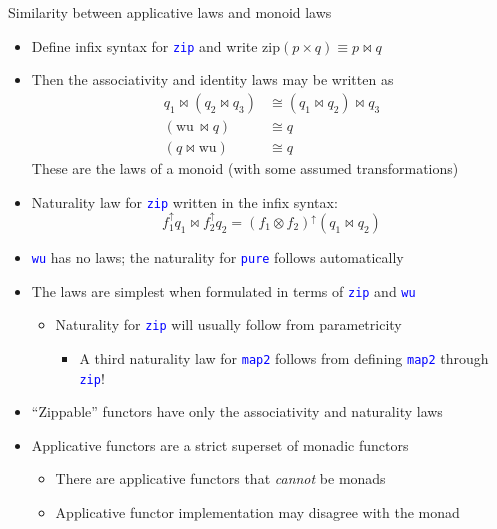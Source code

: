 \documentclass[english]{beamer}
\begin{document}
\begin{frame}{Similarity between applicative laws and monoid laws}
\begin{itemize}
\item Define infix syntax for \texttt{\textcolor{blue}{\footnotesize{}zip}}
and write $\text{zip}\left(p\times q\right)\equiv p\bowtie q$
\item Then the associativity and identity laws may be written as{\footnotesize{}
\begin{align*}
q_{1}\bowtie\left(q_{2}\bowtie q_{3}\right) & \cong\left(q_{1}\bowtie q_{2}\right)\bowtie q_{3}\\
\left(\text{wu}\,\bowtie q\right) & \cong q\\
\left(q\bowtie\text{wu}\right) & \cong q
\end{align*}
}These are the laws of a monoid (with some assumed transformations)
\item Naturality law for \texttt{\textcolor{blue}{\footnotesize{}zip}} written
in the infix syntax:{\footnotesize{}
\[
f_{1}^{\uparrow}q_{1}\bowtie f_{2}^{\uparrow}q_{2}=\left(f_{1}\otimes f_{2}\right)^{\uparrow}\left(q_{1}\bowtie q_{2}\right)
\]
}{\footnotesize \par}
\item \texttt{\textcolor{blue}{\footnotesize{}wu}} has no laws; the naturality
for \texttt{\textcolor{blue}{\footnotesize{}pure}} follows automatically
\item The laws are simplest when formulated in terms of \texttt{\textcolor{blue}{\footnotesize{}zip}}
and \texttt{\textcolor{blue}{\footnotesize{}wu}} 
\begin{itemize}
\item Naturality for \texttt{\textcolor{blue}{\footnotesize{}zip}} will
usually follow from parametricity
\begin{itemize}
\item A third naturality law for \texttt{\textcolor{blue}{\footnotesize{}map2}}
follows from defining \texttt{\textcolor{blue}{\footnotesize{}map2}}
through \texttt{\textcolor{blue}{\footnotesize{}zip}}!
\end{itemize}
\end{itemize}
\item ``Zippable'' functors have only the associativity and naturality
laws
\item Applicative functors are a strict superset of monadic functors
\begin{itemize}
\item There are applicative functors that \emph{cannot} be monads
\item Applicative functor implementation may disagree with the monad
\end{itemize}
\end{itemize}
\end{frame}
\end{document}
